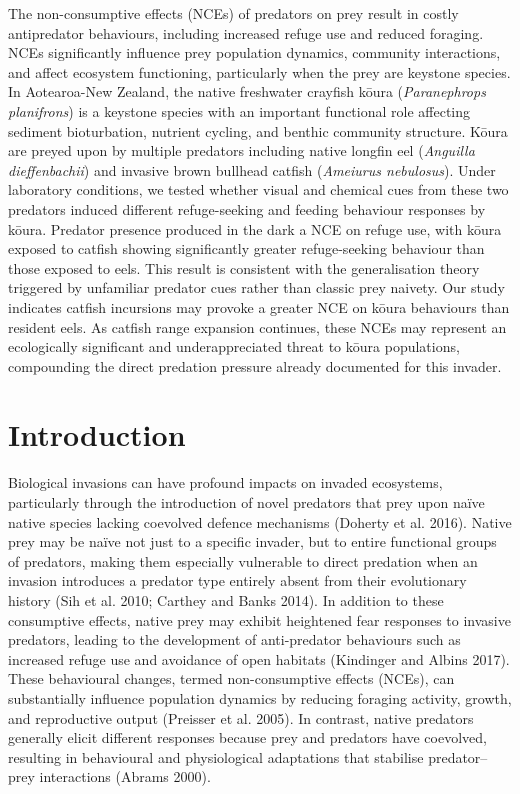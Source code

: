 \documentclass[
  12pt,
  a4paper,
]{scrbook}
\begin{document}
The non-consumptive effects (NCEs) of predators on prey result in costly
antipredator behaviours, including increased refuge use and reduced
foraging. NCEs significantly influence prey population dynamics,
community interactions, and affect ecosystem functioning, particularly
when the prey are keystone species. In Aotearoa-New Zealand, the native
freshwater crayfish kōura (\emph{Paranephrops planifrons}) is a keystone
species with an important functional role affecting sediment
bioturbation, nutrient cycling, and benthic community structure. Kōura
are preyed upon by multiple predators including native longfin eel
(\emph{Anguilla dieffenbachii}) and invasive brown bullhead catfish
(\emph{Ameiurus nebulosus}). Under laboratory conditions, we tested
whether visual and chemical cues from these two predators induced
different refuge-seeking and feeding behaviour responses by kōura.
Predator presence produced in the dark a NCE on refuge use, with kōura
exposed to catfish showing significantly greater refuge-seeking
behaviour than those exposed to eels. This result is consistent with the
generalisation theory triggered by unfamiliar predator cues rather than
classic prey naivety. Our study indicates catfish incursions may provoke
a greater NCE on kōura behaviours than resident eels. As catfish range
expansion continues, these NCEs may represent an ecologically
significant and underappreciated threat to kōura populations,
compounding the direct predation pressure already documented for this
invader.

\hfill\break


\chapter{Introduction}\label{introduction}

Biological invasions can have profound impacts on invaded ecosystems,
particularly through the introduction of novel predators that prey upon
naïve native species lacking coevolved defence mechanisms (Doherty et
al. 2016). Native prey may be naïve not just to a specific invader, but
to entire functional groups of predators, making them especially
vulnerable to direct predation when an invasion introduces a predator
type entirely absent from their evolutionary history (Sih et al. 2010;
Carthey and Banks 2014). In addition to these consumptive effects,
native prey may exhibit heightened fear responses to invasive predators,
leading to the development of anti-predator behaviours such as increased
refuge use and avoidance of open habitats (Kindinger and Albins 2017).
These behavioural changes, termed non-consumptive effects (NCEs), can
substantially influence population dynamics by reducing foraging
activity, growth, and reproductive output (Preisser et al. 2005). In
contrast, native predators generally elicit different responses because
prey and predators have coevolved, resulting in behavioural and
physiological adaptations that stabilise predator--prey interactions
(Abrams 2000).
\end{document}
